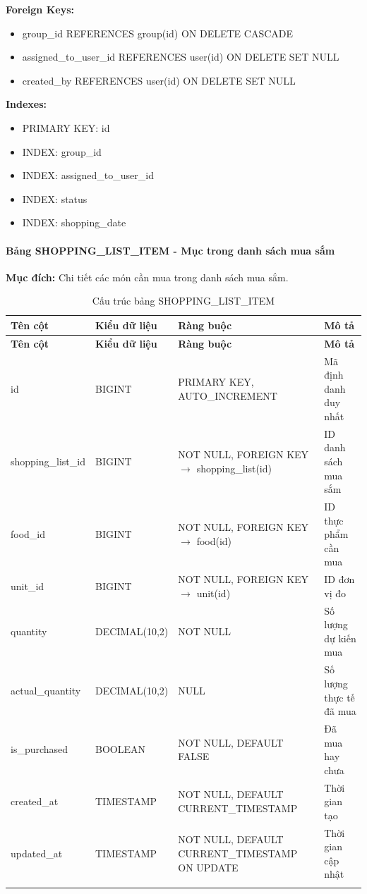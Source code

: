 \textbf{Foreign Keys:}
\begin{itemize}
    \item group\_id REFERENCES group(id) ON DELETE CASCADE
    \item assigned\_to\_user\_id REFERENCES user(id) ON DELETE SET NULL
    \item created\_by REFERENCES user(id) ON DELETE SET NULL
\end{itemize}

\textbf{Indexes:}
\begin{itemize}
    \item PRIMARY KEY: id
    \item INDEX: group\_id
    \item INDEX: assigned\_to\_user\_id
    \item INDEX: status
    \item INDEX: shopping\_date
\end{itemize}

\paragraph{Bảng SHOPPING\_LIST\_ITEM - Mục trong danh sách mua sắm}
\textbf{Mục đích:} Chi tiết các món cần mua trong danh sách mua sắm.

\small
\begin{longtable}{|>{\raggedright\arraybackslash}p{3.8cm}|>{\raggedright\arraybackslash}p{3cm}|>{\raggedright\arraybackslash}p{3.8cm}|>{\raggedright\arraybackslash}p{3.9cm}|}
\hline
\textbf{Tên cột} & \textbf{Kiểu dữ liệu} & \textbf{Ràng buộc} & \textbf{Mô tả} \\
\hline
\endfirsthead
\hline
\textbf{Tên cột} & \textbf{Kiểu dữ liệu} & \textbf{Ràng buộc} & \textbf{Mô tả} \\
\hline
\endhead
id & BIGINT & PRIMARY KEY, AUTO\_INCREMENT & Mã định danh duy nhất \\
\hline
shopping\_list\_id & BIGINT & NOT NULL, FOREIGN KEY $\rightarrow$ shopping\_list(id) & ID danh sách mua sắm \\
\hline
food\_id & BIGINT & NOT NULL, FOREIGN KEY $\rightarrow$ food(id) & ID thực phẩm cần mua \\
\hline
unit\_id & BIGINT & NOT NULL, FOREIGN KEY $\rightarrow$ unit(id) & ID đơn vị đo \\
\hline
quantity & DECIMAL(10,2) & NOT NULL & Số lượng dự kiến mua \\
\hline
actual\_quantity & DECIMAL(10,2) & NULL & Số lượng thực tế đã mua \\
\hline
is\_purchased & BOOLEAN & NOT NULL, DEFAULT FALSE & Đã mua hay chưa \\
\hline
created\_at & TIMESTAMP & NOT NULL, DEFAULT CURRENT\_TIMESTAMP & Thời gian tạo \\
\hline
updated\_at & TIMESTAMP & NOT NULL, DEFAULT CURRENT\_TIMESTAMP ON UPDATE & Thời gian cập nhật \\
\hline
\caption{Cấu trúc bảng SHOPPING\_LIST\_ITEM}
\end{longtable}


